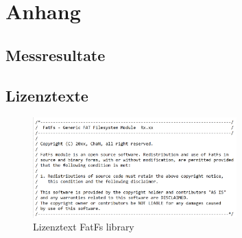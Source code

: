 \section{Anhang}\label{sec:anhang}

\subsection{Messresultate}\label{sec:messresultate}

\subsection{Lizenztexte}\label{sec:lizenztexte}

\begin{figure}[H]
	\begin{center}
		\includegraphics[width=0.7\textwidth]{data/Lizenztext_FatFs.png}
		\caption{Lizenztext FatFs library} %
		\label{fig:Lizentext FatFs}
	\end{center}
\end{figure}
